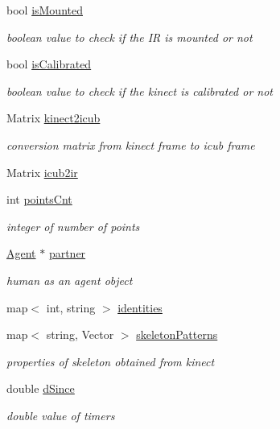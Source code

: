 \begin{DoxyCompactItemize}
bool \hyperlink{group__agentDetector_a479858be24a1f5405ca47a51618dc8ce}{is\+Mounted}
\begin{DoxyCompactList}\small\item\em boolean value to check if the IR is mounted or not \end{DoxyCompactList}\item 
bool \hyperlink{group__agentDetector_a901883d999711b6632f0ecc5114ea0ca}{is\+Calibrated}
\begin{DoxyCompactList}\small\item\em boolean value to check if the kinect is calibrated or not \end{DoxyCompactList}\item 
Matrix \hyperlink{group__agentDetector_a2bd8fc165ecc3ddb4fa11b57255f3e28}{kinect2icub}
\begin{DoxyCompactList}\small\item\em conversion matrix from kinect frame to icub frame \end{DoxyCompactList}\item 
Matrix \hyperlink{group__agentDetector_a9f319fe7d3efdaa95b90509ca177dd51}{icub2ir}
\item 
int \hyperlink{group__agentDetector_a4b18a14345740285b71b1287b2c430fc}{points\+Cnt}
\begin{DoxyCompactList}\small\item\em integer of number of points \end{DoxyCompactList}\item 
\hyperlink{group__icubclient__representations_classicubclient_1_1Agent}{Agent} $\ast$ \hyperlink{group__agentDetector_a38a81af762b23e270a34dd75ea95e0cd}{partner}
\begin{DoxyCompactList}\small\item\em human as an agent object \end{DoxyCompactList}\item 
map$<$ int, string $>$ \hyperlink{group__agentDetector_afbbfd1710693aad1f25ee1e01af512ea}{identities}
\item 
map$<$ string, Vector $>$ \hyperlink{group__agentDetector_a325c1d7d68fe58e337e50327b7276160}{skeleton\+Patterns}
\begin{DoxyCompactList}\small\item\em properties of skeleton obtained from kinect \end{DoxyCompactList}\item 
double \hyperlink{group__agentDetector_a1866219161a7e18eedc710a943687565}{d\+Since}
\begin{DoxyCompactList}\small\item\em double value of timers \end{DoxyCompactList}\item 

\end{DoxyCompactItemize}
